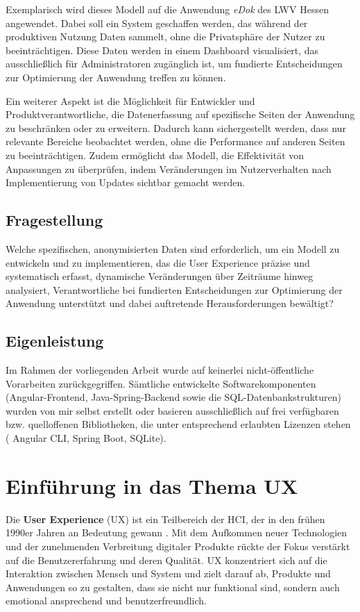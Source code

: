 \documentclass[12pt,oneside]{article}
\begin{document}
Exemplarisch wird dieses Modell auf die Anwendung \textit{eDok} des LWV Hessen angewendet. Dabei soll ein System geschaffen werden, das während der produktiven Nutzung Daten sammelt, ohne die Privatsphäre der Nutzer zu beeinträchtigen. Diese Daten werden in einem Dashboard visualisiert, das ausschließlich für Administratoren zugänglich ist, um fundierte Entscheidungen zur Optimierung der Anwendung treffen zu können.

Ein weiterer Aspekt ist die Möglichkeit für Entwickler und Produktverantwortliche, die Datenerfassung auf spezifische Seiten der Anwendung zu beschränken oder zu erweitern. Dadurch kann sichergestellt werden, dass nur relevante Bereiche beobachtet werden, ohne die Performance auf anderen Seiten zu beeinträchtigen. Zudem ermöglicht das Modell, die Effektivität von Anpassungen zu überprüfen, indem Veränderungen im Nutzerverhalten nach Implementierung von Updates sichtbar gemacht werden.

\subsection{Fragestellung}

Welche spezifischen, anonymisierten Daten sind erforderlich, um ein Modell zu entwickeln und zu implementieren, das die User Experience präzise und systematisch erfasst, dynamische Veränderungen über Zeiträume hinweg analysiert, Verantwortliche bei fundierten Entscheidungen zur Optimierung der Anwendung unterstützt und dabei auftretende Herausforderungen bewältigt?
\subsection{Eigenleistung}
Im Rahmen der vorliegenden Arbeit wurde auf keinerlei nicht-öffentliche Vorarbeiten zurückgegriffen. Sämtliche entwickelte Softwarekomponenten (Angular-Frontend, Java-Spring-Backend sowie die SQL-Datenbankstrukturen) wurden von mir selbst erstellt oder basieren ausschließlich auf frei verfügbaren bzw. quelloffenen Bibliotheken, die unter entsprechend erlaubten Lizenzen stehen ( Angular CLI, Spring Boot, SQLite).


 




\section{Einführung in das Thema UX}

Die \textbf{User Experience} (UX) ist ein Teilbereich der HCI, der in den frühen 1990er Jahren an Bedeutung gewann \cite{glanznig}. Mit dem Aufkommen neuer Technologien und der zunehmenden Verbreitung digitaler Produkte rückte der Fokus verstärkt auf die Benutzererfahrung und deren Qualität. UX konzentriert sich auf die Interaktion zwischen Mensch und System und zielt darauf ab, Produkte und Anwendungen so zu gestalten, dass sie nicht nur funktional sind, sondern auch emotional ansprechend und benutzerfreundlich.
\end{document}
